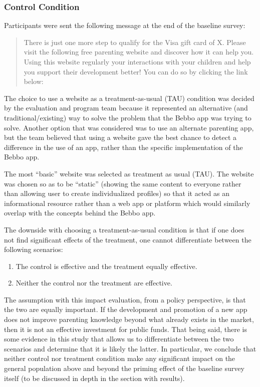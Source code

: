 \documentclass{article}
\begin{document}
\subsubsection*{Control Condition}
Participants were sent the following message at the end of the baseline survey:

\begin{quote}
There is just one more step to qualify for the Visa gift card of X. Please visit the following free parenting website and discover how it can help you. Using this website regularly your interactions with your children and help you support their development better! You can do so by clicking the link below:
\end{quote}

The choice to use a website as a treatment-as-usual (TAU) condition was decided by the evaluation and program team because it represented an alternative (and traditional/existing) way to solve the problem that the Bebbo app was trying to solve. Another option that was considered was to use an alternate parenting app, but the team believed that using a website gave the best chance to detect a difference in the use of an app, rather than the specific implementation of the Bebbo app.

The most “basic” website was selected as treatment as usual (TAU). The website was chosen so as to be “static” (showing the same content to everyone rather than allowing user to create individualized profiles) so that it acted as an informational resource rather than a web app or platform which would similarly overlap with the concepts behind the Bebbo app.

The downside with choosing a treatment-as-usual condition is that if one does not find significant effects of the treatment, one cannot differentiate between the following scenarios:

\begin{enumerate}
\item The control is effective and the treatment equally effective.
\item Neither the control nor the treatment are effective.
\end{enumerate}

The assumption with this impact evaluation, from a policy perspective, is that the two are equally important. If the development and promotion of a new app does not improve parenting knowledge beyond what already exists in the market, then it is not an effective investment for public funds. That being said, there is some evidence in this study that allows us to differentiate between the two scenarios and determine that it is likely the latter. In particular, we conclude that neither control nor treatment condition make any significant impact on the general population above and beyond the priming effect of the baseline survey itself (to be discussed in depth in the section with results).
\end{document}
